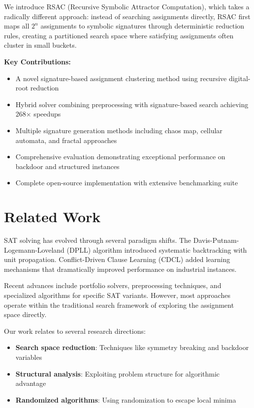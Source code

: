 \documentclass[conference]{IEEEtran}
\begin{document}
We introduce RSAC (Recursive Symbolic Attractor Computation), which takes a radically different approach: instead of searching assignments directly, RSAC first maps all $2^n$ assignments to symbolic signatures through deterministic reduction rules, creating a partitioned search space where satisfying assignments often cluster in small buckets.

\textbf{Key Contributions:}
\begin{itemize}
\item A novel signature-based assignment clustering method using recursive digital-root reduction
\item Hybrid solver combining preprocessing with signature-based search achieving 268$\times$ speedups
\item Multiple signature generation methods including chaos map, cellular automata, and fractal approaches
\item Comprehensive evaluation demonstrating exceptional performance on backdoor and structured instances
\item Complete open-source implementation with extensive benchmarking suite
\end{itemize}

\section{Related Work}

SAT solving has evolved through several paradigm shifts. The Davis-Putnam-Logemann-Loveland (DPLL) algorithm \cite{dpll} introduced systematic backtracking with unit propagation. Conflict-Driven Clause Learning (CDCL) \cite{cdcl} added learning mechanisms that dramatically improved performance on industrial instances.

Recent advances include portfolio solvers, preprocessing techniques, and specialized algorithms for specific SAT variants. However, most approaches operate within the traditional search framework of exploring the assignment space directly.

Our work relates to several research directions:
\begin{itemize}
\item \textbf{Search space reduction}: Techniques like symmetry breaking and backdoor variables
\item \textbf{Structural analysis}: Exploiting problem structure for algorithmic advantage
\item \textbf{Randomized algorithms}: Using randomization to escape local minima
\end{itemize}
\end{document}
